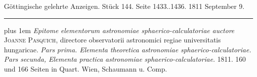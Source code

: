 \clearpage
{}
\begin{center}\small Göttingische gelehrte Anzeigen. Stück 144. Seite 1433..1436. 1811 September 9.\\[3pt]\rule{.72\linewidth}{.3pt}\end{center}

{\rightskip=0pt plus 1em \emph{Epitome elementorum astronomiae sphaerico-calculatoriae auctore} \textsc{Joanne Pasquich}, directore observatorii astronomici regiae universitatis hungaricae. \emph{Pars prima. Elementa {theoretica} astronomiae sphaerico-calculatoriae. Pars secunda, Elementa {practica} astronomiae sphaerico-calculatoriae.} 1811. 160 und 166 Seiten in Quart. Wien, Schaumann u. Comp.\par}

